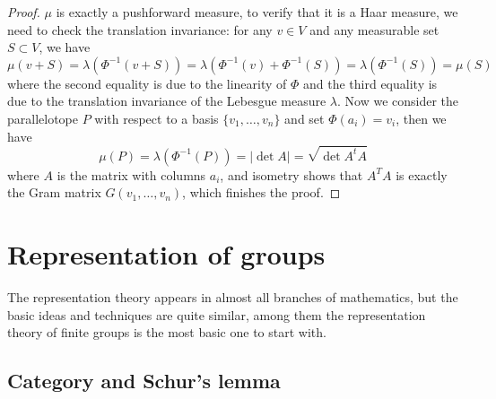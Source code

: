 \begin{proof}
    \(\mu\) is exactly a pushforward measure, to verify that it is a Haar measure, we need to check the translation invariance: for any \(v \in V\) and any measurable set \(S \subset V\), we have
    \[\mu(v+S) = \lambda(\Phi^{-1}(v+S)) = \lambda(\Phi^{-1}(v) + \Phi^{-1}(S)) = \lambda(\Phi^{-1}(S)) = \mu(S)\]
    where the second equality is due to the linearity of \(\Phi\) and the third equality is due to the translation invariance of the Lebesgue measure \(\lambda\). Now we consider the parallelotope \(P\) with respect to a basis \(\{v_1,\dots,v_n\}\) and set \(\Phi(a_i) = v_i\), then we have
    \[\mu(P) = \lambda (\Phi^{-1}(P)) = |\det A| = \sqrt{\det A^tA}\]
    where \(A\) is the matrix with columns \(a_i\), and isometry shows that \(A^TA\) is exactly the Gram matrix \(G(v_1,\dots,v_n)\), which finishes the proof.
\end{proof}



\newpage

\section{Representation of groups}

The representation theory appears in almost all branches of mathematics, but the basic ideas and techniques are quite similar, among them the representation theory of finite groups is the most basic one to start with.

\subsection{Category and Schur's lemma}

